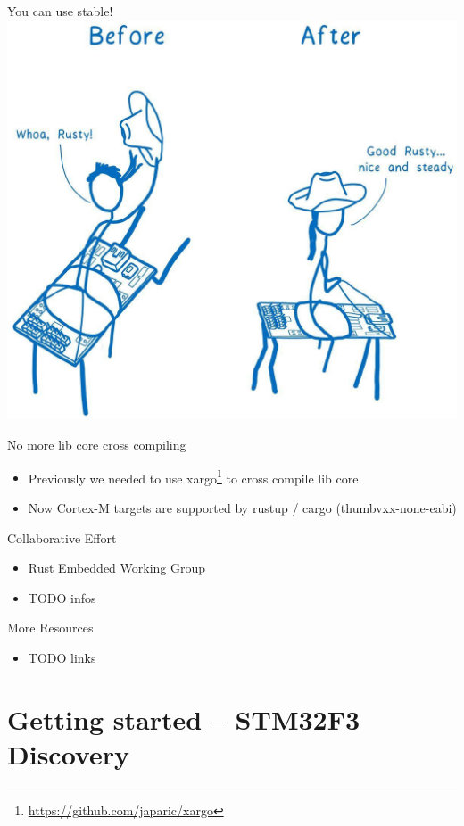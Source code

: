 \documentclass[aspectratio=1610,14pt,t]{beamer}
\begin{document}
\begin{frame}[c]{You can use stable!}
  \includegraphics[width=.7\textwidth]{img/embedded-is-stable.jpg}
\end{frame}

\begin{frame}[c]{No more lib core cross compiling}
  \begin{itemize}
    \item Previously we needed to use
      xargo\footnote{\url{https://github.com/japaric/xargo}} to cross compile
      lib core
    \item Now Cortex-M targets are supported by rustup / cargo
      (thumbvxx-none-eabi)
  \end{itemize}
\end{frame}

\begin{frame}[c]{Collaborative Effort}
  \begin{itemize}
    \item Rust Embedded Working Group
    \item TODO infos
  \end{itemize}
\end{frame}

\begin{frame}[c]{More Resources}
  \begin{itemize}
    \item TODO links
  \end{itemize}
\end{frame}

\section{Getting started – STM32F3 Discovery}
\end{document}
